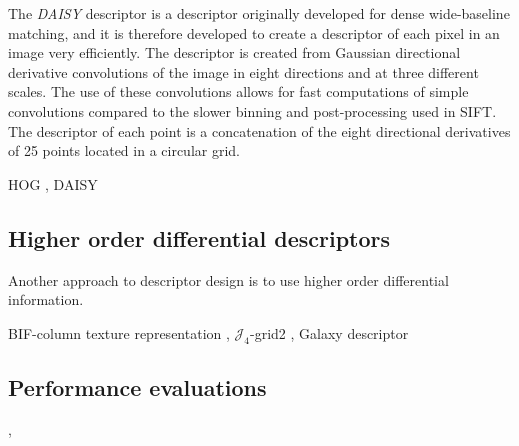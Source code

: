 \documentclass[../thesis.tex]{subfiles}
\begin{document}
The \emph{DAISY} descriptor \cite{tola2008fast} is a descriptor originally
developed for dense wide-baseline matching, and it is therefore developed to
create a descriptor of each pixel in an image very efficiently. The descriptor
is created from Gaussian directional derivative convolutions of the image in
eight directions and at three different scales. The use of these convolutions
allows for fast computations of simple convolutions compared to the slower
binning and post-processing used in SIFT. The descriptor of each point is a
concatenation of the eight directional derivatives of 25 points located in a
circular grid.

HOG \cite{dalal2005histograms},
DAISY \cite{tola2008fast,winder2009picking}

\subsection{Higher order differential descriptors}

Another approach to descriptor design is to use higher order differential
information.

BIF-column texture representation \cite{crosier2010using},
$\mathcal{J}_4$-grid2 \cite{larsen2012jet},
Galaxy descriptor \cite{pedersen2013shape}

\subsection{Performance evaluations}

\cite{mikolajczyk2005performance},
\cite{dahl2011finding}

\subbibliography
\end{document}
